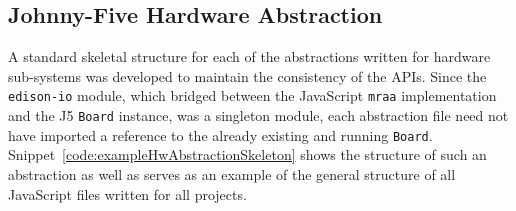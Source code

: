     \subsection{Johnny-Five Hardware Abstraction}
      A standard skeletal structure for each of the abstractions written for hardware sub-systems was developed to maintain the consistency of the APIs. Since the \texttt{edison-io} module, which bridged between the JavaScript \texttt{mraa} implementation and the J5 \texttt{Board} instance, was a singleton module, each abstraction file need not have imported a reference to the already existing and running \texttt{Board}. Snippet~\ref{code:exampleHwAbstractionSkeleton} shows the structure of such an abstraction as well as serves as an example of the general structure of all JavaScript files written for all projects.
      
